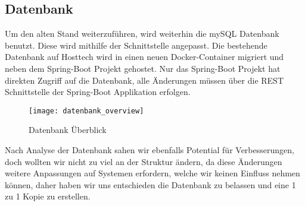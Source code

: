 \documentclass[../main.tex]{subfiles}
\begin{document}
	\subsection{Datenbank}
	Um den alten Stand weiterzuführen, wird weiterhin die mySQL Datenbank benutzt. Diese wird mithilfe der Schnittstelle angepasst.
	Die bestehende Datenbank auf Hosttech wird in einen neuen Docker-Container migriert und neben dem Spring-Boot Projekt gehostet. Nur das Spring-Boot Projekt hat direkten Zugriff auf die Datenbank, alle Änderungen müssen über die REST Schnittstelle der Spring-Boot Applikation erfolgen.
	
	\begin{figure}[H]
		\centering
		\texttt{[image: datenbank\_overview]}
		\caption{Datenbank Überblick}
		\label{fig:datenbank_overview}
	\end{figure}
	
	Nach Analyse der Datenbank sahen wir ebenfalls Potential für Verbesserungen, doch wollten wir nicht zu viel an der Struktur ändern, da diese Änderungen weitere Anpassungen auf Systemen erfordern, welche wir keinen Einfluss nehmen können, daher haben wir uns entschieden die Datenbank zu belassen und eine 1 zu 1 Kopie zu erstellen.
\end{document}
